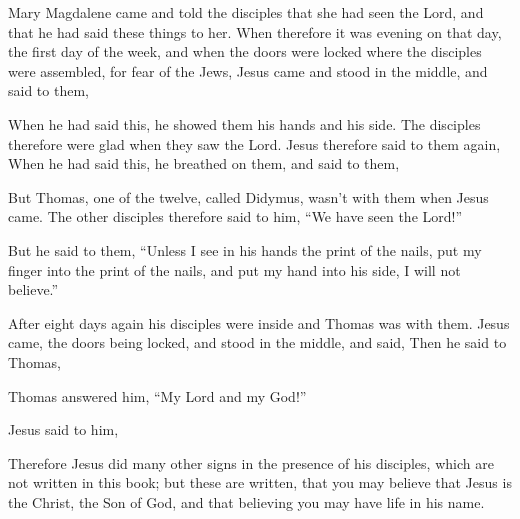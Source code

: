 {\par }{\PP {}Mary Magdalene came and told the disciples that she had seen the Lord, and that he had said these things to her.
When therefore it was evening on that day, the first day of the week, and when the doors were locked where the disciples were assembled, for fear of the Jews, Jesus came and stood in the middle, and said to them,
{}
\par }{\PP {}When he had said this, he showed them his hands and his side. The disciples therefore were glad when they saw the Lord.
Jesus therefore said to them again,
{}
When he had said this, he breathed on them, and said to them,
{}
\par }{\PP {}But Thomas, one of the twelve, called Didymus, wasn’t with them when Jesus came.
The other disciples therefore said to him, “We have seen the Lord!”
\par }{\PP But he said to them, “Unless I see in his hands the print of the nails, put my finger into the print of the nails, and put my hand into his side, I will not believe.”
\par }{\PP {}After eight days again his disciples were inside and Thomas was with them. Jesus came, the doors being locked, and stood in the middle, and said,
{}
Then he said to Thomas,
{}
\par }{\PP {}Thomas answered him, “My Lord and my God!”
\par }{\PP {}Jesus said to him,
{}
{}
\par }{\PP {}Therefore Jesus did many other signs in the presence of his disciples, which are not written in this book;
but these are written, that you may believe that Jesus is the Christ, the Son of God, and that believing you may have life in his name.

}
